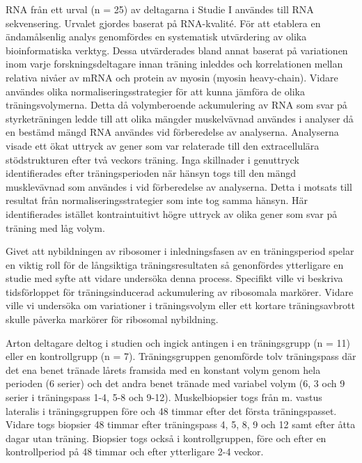 \documentclass[twoside,10pt]{gihclass} %
\begin{document}
RNA från ett urval (n = 25) av deltagarna i Studie I användes till RNA sekvensering. Urvalet gjordes baserat på RNA-kvalité. För att etablera en ändamålsenlig analys genomfördes en systematisk utvärdering av olika bioinformatiska verktyg. Dessa utvärderades bland annat baserat på variationen inom varje forskningsdeltagare innan träning inleddes och korrelationen mellan relativa nivåer av mRNA och protein av myosin (myosin heavy-chain).
Vidare användes olika normaliseringsstrategier för att kunna jämföra de olika träningsvolymerna. Detta då volymberoende ackumulering av RNA som svar på styrketräningen ledde till att olika mängder muskelvävnad användes i analyser då en bestämd mängd RNA användes vid förberedelse av analyserna.
Analyserna visade ett ökat uttryck av gener som var relaterade till den extracellulära stödstrukturen efter två veckors träning. Inga skillnader i genuttryck identifierades efter träningsperioden när hänsyn togs till den mängd musklevävnad som användes i vid förberedelse av analyserna. Detta i motsats till resultat från normaliseringsstrategier som inte tog samma hänsyn. Här identifierades istället kontraintuitivt högre uttryck av olika gener som svar på träning med låg volym.

Givet att nybildningen av ribosomer i inledningsfasen av en träningsperiod spelar en viktig roll för de långsiktiga träningsresultaten så genonfördes ytterligare en studie med syfte att vidare undersöka denna process. Specifikt ville vi beskriva tidsförloppet för träningsinducerad ackumulering av ribosomala markörer. Vidare ville vi undersöka om variationer i träningsvolym eller ett kortare träningsavbrott skulle påverka markörer för ribosomal nybildning.

Arton deltagare deltog i studien och ingick antingen i en träningsgrupp (n = 11) eller en kontrollgrupp (n = 7). Träningsgruppen genomförde tolv träningspass där det ena benet tränade lårets framsida med en konstant volym genom hela perioden (6 serier) och det andra benet tränade med variabel volym (6, 3 och 9 serier i träningspass 1-4, 5-8 och 9-12). Muskelbiopsier togs från m. vastus lateralis i träningsgruppen före och 48 timmar efter det första träningspasset. Vidare togs biopsier 48 timmar efter träningspass 4, 5, 8, 9 och 12 samt efter åtta dagar utan träning. Biopsier togs också i kontrollgruppen, före och efter en kontrollperiod på 48 timmar och efter ytterligare 2-4 veckor.
\end{document}
